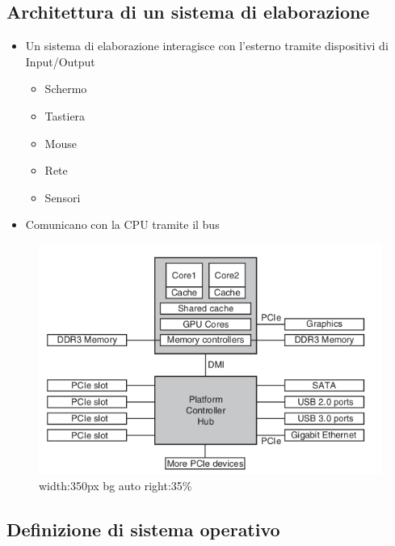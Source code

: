 \documentclass[]{article}
\providecommand{\tightlist}{%
  \setlength{\itemsep}{0pt}\setlength{\parskip}{0pt}}
\begin{document}
\hypertarget{architettura-di-un-sistema-di-elaborazione-1}{%
\subsection{Architettura di un sistema di
elaborazione}\label{architettura-di-un-sistema-di-elaborazione-1}}

\begin{itemize}
\tightlist
\item
  Un sistema di elaborazione interagisce con l'esterno tramite
  dispositivi di Input/Output

  \begin{itemize}
  \tightlist
  \item
    Schermo
  \item
    Tastiera
  \item
    Mouse
  \item
    Rete
  \item
    Sensori
  \end{itemize}
\item
  Comunicano con la CPU tramite il bus
\end{itemize}

\begin{figure}
\centering
\includegraphics{images/io.png}
\caption{width:350px bg auto right:35\%}
\end{figure}

\hypertarget{definizione-di-sistema-operativo}{%
\subsection{Definizione di sistema
operativo}\label{definizione-di-sistema-operativo}}
\end{document}
